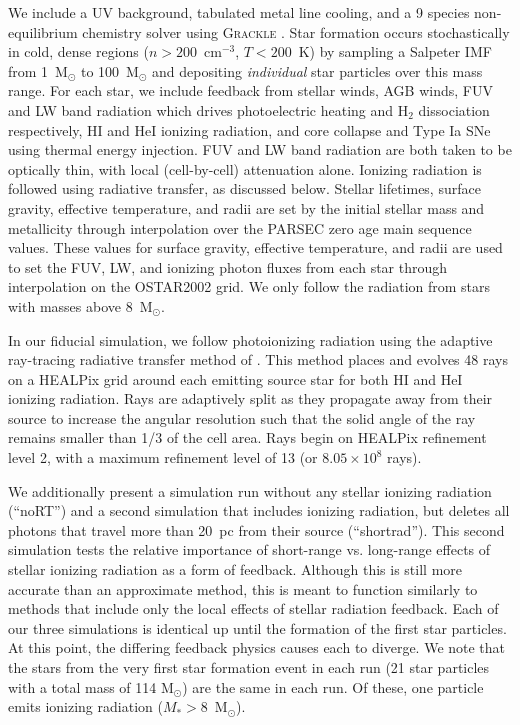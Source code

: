 \documentclass[twocolumn]{aastex62}
\begin{document}
We include a UV background, tabulated metal line cooling, and a 9 species non-equilibrium chemistry solver using \textsc{Grackle} \citep{GrackleMethod}. Star formation occurs stochastically in cold, dense regions ($n > 200$~cm$^{-3}$, $T < 200$~K) by sampling a \cite{Salpeter1955} Salpeter IMF from 1~M$_{\odot}$ to 100~M$_{\odot}$ and depositing \textit{individual} star particles over this mass range. For each star, we include feedback from stellar winds, AGB winds, FUV and LW band radiation which drives photoelectric heating and H$_2$ dissociation respectively, HI and HeI ionizing radiation, and core collapse and Type Ia SNe using thermal energy injection. FUV and LW band radiation are both taken to be optically thin, with local (cell-by-cell) attenuation alone. Ionizing radiation is followed using radiative transfer, as discussed below. Stellar lifetimes, surface gravity, effective temperature, and radii are set by the initial stellar mass and metallicity through interpolation over the PARSEC \citep{Bressan2012} zero age main sequence values. These values for surface gravity, effective temperature, and radii are used to set the FUV, LW, and ionizing photon fluxes from each star through interpolation on the OSTAR2002 \citep{LanzHubeny2003} grid. We only follow the radiation from stars with masses above 8~M$_{\odot}$. 


In our fiducial simulation, we follow photoionizing radiation using the adaptive ray-tracing radiative transfer method of \cite{WiseAbel2011}. This method places and evolves 48 rays on a HEALPix grid around each emitting source star for both HI and HeI ionizing radiation. Rays are adaptively split as they propagate away from their source to increase the angular resolution such that the solid angle of the ray remains smaller than 1/3 of the cell area. Rays begin on HEALPix refinement level 2, with a maximum refinement level of 13 (or $8.05 \times 10^8$ rays).

We additionally present a simulation run without any stellar ionizing radiation (``noRT'') and a second simulation that includes ionizing radiation, but deletes all photons that travel more than 20~pc from their source (``shortrad''). This second simulation tests the relative importance of short-range vs. long-range effects of stellar ionizing radiation as a form of feedback. Although this is still more accurate than an approximate method, this is meant to function similarly to methods that include only the local effects of stellar radiation feedback. Each of our three simulations is identical up until the formation of the first star particles. At this point, the differing feedback physics causes each to diverge. We note that the stars from the very first star formation event in each run (21 star particles with a total mass of 114 M$_{\odot}$) are the same in each run. Of these, one particle emits ionizing radiation ($M_* > 8 $~M$_{\odot}$). 
\end{document}
